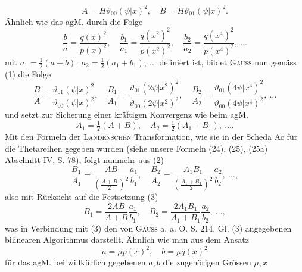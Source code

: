 \begin{equation*}
A=H\vartheta_{00}(\psi|x)^2,\quad B=H\vartheta_{01}(\psi|x)^2.\tag{1}
\end{equation*}\endgroup
\noindent Ähnlich wie das agM. durch die Folge
\[
\frac{b}{a}=\frac{q(x)^2}{p(x)^2},\quad
\frac{b_1}{a_1}=\frac{q(x^2)^2}{p(x^2)^2},\quad
\frac{b_2}{a_2}=\frac{q(x^4)^2}{p(x^4)^2},\ \ldots
\]
mit \(a_1=\tfrac12(a+b),\ a_2=\tfrac12(a_1+b_1),\ \ldots\) definiert ist, bildet \textsc{Gauss} nun gemäss
(1) die Folge
\begingroup\makeatletter\tagsleft@true\let\veqno\leqno\makeatother
\begin{equation*}
\frac{B}{A}=\frac{\vartheta_{01}(\psi|x)^2}{\vartheta_{00}(\psi|x)^2},\quad
\frac{B_1}{A_1}=\frac{\vartheta_{01}(2\psi|x^2)^2}{\vartheta_{00}(2\psi|x^2)^2},\quad
\frac{B_2}{A_2}=\frac{\vartheta_{01}(4\psi|x^4)^2}{\vartheta_{00}(4\psi|x^4)^2},\ \ldots\tag{2}
\end{equation*}\endgroup
\noindent und setzt zur Sicherung einer kräftigen Konvergenz wie beim agM.
\begingroup\makeatletter\tagsleft@true\let\veqno\leqno\makeatother
\begin{equation*}
A_1=\tfrac12(A+B),\quad A_2=\tfrac12(A_1+B_1),\ \ldots.\tag{3}
\end{equation*}\endgroup
\noindent Mit den Formeln der \textsc{Landenschen} Transformation, wie sie in der Scheda Ac
für die Thetareihen gegeben wurden (siehe unsere Formeln (24), (25), (25a)
Abschnitt IV, S. 78), folgt nunmehr aus (2)
\begingroup\makeatletter\tagsleft@true\let\veqno\leqno\makeatother
\begin{equation*}
\frac{B_1}{A_1}=\frac{AB}{\left(\frac{A+B}{2}\right)^2}\frac{a_1}{b_1},\quad
\frac{B_2}{A_2}=\frac{A_1B_1}{\left(\frac{A_1+B_1}{2}\right)^2}\frac{a_2}{b_2},\ \ldots,\tag{4}
\end{equation*}\endgroup
\noindent also mit Rücksicht auf die Festsetzung (3)
\begingroup\makeatletter\tagsleft@true\let\veqno\leqno\makeatother
\begin{equation*}
B_1=\frac{2AB}{A+B}\frac{a_1}{b_1},\quad
B_2=\frac{2A_1B_1}{A_1+B_1}\frac{a_2}{b_2},\ \ldots,\tag{5}
\end{equation*}\endgroup
\noindent was in Verbindung mit (3) den von \textsc{Gauss} a. a. O. S. 214, Gl. (3) angegebenen
bilinearen Algorithmus darstellt. Ähnlich wie man aus dem Ansatz
\[
a=\mu p(x)^2,\quad b=\mu q(x)^2
\]
für das agM. bei willkürlich gegebenen \(a,b\) die zugehörigen Grössen \(\mu,x\)\par
\clearpage{}
